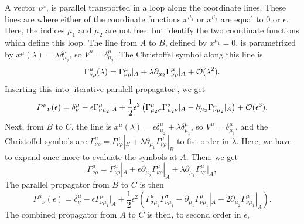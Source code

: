 %
A vector $v^\mu$, is parallel transported in a loop along the coordinate lines.
These lines are where either of the coordinate functions $x^{\mu_1}$ or $x^{\mu_2}$ are equal to $0$ or $\epsilon$.
Here, the indices $\mu_1$ and $\mu_2$ are not free, but identify the two coordinate functions which define this loop.
The line from $A$ to $B$, defined by $x^{\mu_1} = 0$, is parametrized by $x^\mu(\lambda) = \lambda \delta^\mu_{\mu_2}$, so $ V^\mu = \delta^\mu_{\mu_2} $.
The Christoffel symbol along this line is
%
\begin{equation}
    \Gamma^{\mu}_{\nu \rho}(\lambda) 
    = \Gamma^{\mu}_{\nu \rho}|_A
    + \lambda \partial_{\mu_2} \Gamma^{\mu}_{\nu \rho}|_A + \mathcal O(\lambda^2).
\end{equation}
%
Inserting this into \autoref{iterative paralell propagator}, we get
%
\begin{equation}
    P^\mu{}_\nu(\epsilon)
    = \delta^\mu_\nu 
    - \epsilon \Gamma^{\mu}_{\nu \mu_2}|_A
    + \frac{1}{2} \epsilon^2 
    \left(
        \Gamma^\mu_{\mu_2 \sigma}\Gamma^\sigma_{\mu_2 \nu} |_A 
        -\partial_{\mu_2} \Gamma^{\mu}_{\nu \mu_2}|_A 
    \right)
    + \mathcal O(\epsilon^3).
\end{equation}
%
Next, from $B$ to $C$, the line is $x^\mu(\lambda) = \epsilon \delta^\mu_{\mu_2} + \lambda \delta^{\mu}_{\mu_1}$, so $V^\mu = \delta^\mu_{\mu_1}$, and the Christoffel symbols are 
$ 
\Gamma^{\mu}_{\nu\rho}
= 
\Gamma^{\mu}_{\nu \rho}|_B
+ \lambda \partial_{\mu_1} \Gamma^{\mu}_{\nu \rho}|_B
$
to fist order in $\lambda$.
Here, we have to expand once more to evaluate the symbols at $A$.
Then, we get
%
\begin{equation}
    \Gamma^{\mu}_{\nu\rho}
    =
    \Gamma^{\mu}_{\nu \rho}|_A + \epsilon \partial_{\mu_2} \Gamma^{\mu}_{\nu \rho}|_A
    + \lambda \partial_{\mu_1} \Gamma^{\mu}_{\nu \rho}|_A,
\end{equation}
%
The parallel propagator from $B$ to $C$ is then
%
\begin{equation}
    P^{\mu}{}_\nu(\epsilon)
    = 
    \delta^\mu_\nu
    - \epsilon \Gamma^{\mu}_{\nu \mu_1}|_A 
    + \frac{1}{2}\epsilon^2
    \left(
        \Gamma^\mu_{\sigma \mu_1}\Gamma^\sigma_{\nu \mu_1}
        - \partial_{\mu_1} \Gamma^{\mu}_{\nu \mu_1}|_A
        - 2 \partial_{\mu_2} \Gamma^{\mu}_{\nu \mu_1}|_A
    \right).
\end{equation}
%
The combined propagator from $A$ to $C$ is then, to second order in $\epsilon$, 
%
